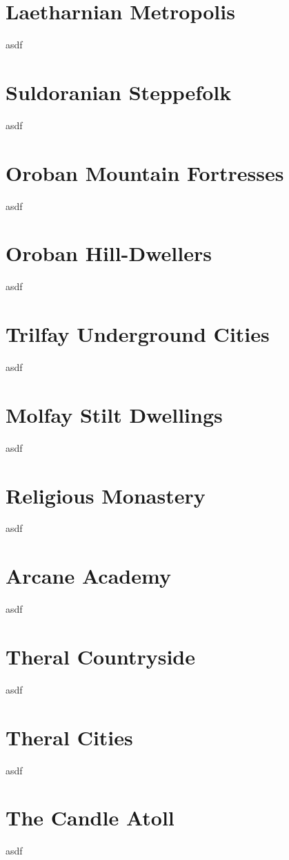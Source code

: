\section{Laetharnian Metropolis}
asdf

\section{Suldoranian Steppefolk}
asdf

\section{Oroban Mountain Fortresses}
asdf

\section{Oroban Hill-Dwellers}
asdf

\section{Trilfay Underground Cities}
asdf

\section{Molfay Stilt Dwellings}
asdf

\section{Religious Monastery}
asdf

\section{Arcane Academy}
asdf

\section{Theral Countryside}
asdf

\section{Theral Cities}
asdf

\section{The Candle Atoll}
asdf

